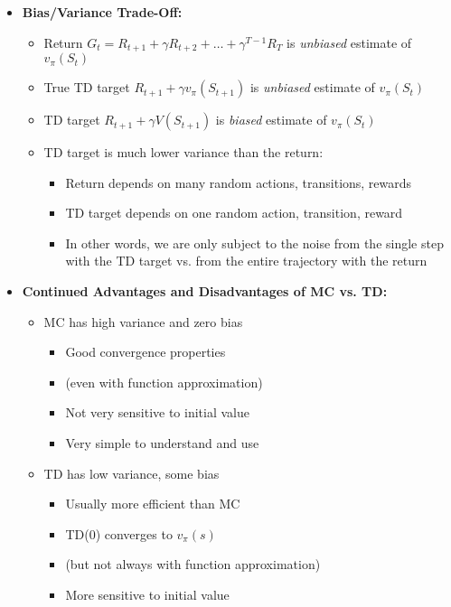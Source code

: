\documentclass[12pt]{article}
\begin{document}
\begin{itemize}
    \item \textbf{Bias/Variance Trade-Off:}
    \begin{itemize}
      \item Return $G_t = R_{t+1} + \gamma R_{t+2} + \dots + \gamma^{T-1}R_T$ is
      \textit{unbiased} estimate of $v_\pi(S_t)$
      \item True TD target $R_{t+1} + \gamma v_\pi(S_{t+1})$ is \textit{unbiased} 
      estimate of $v_\pi(S_t)$
      \item TD target $R_{t+1} + \gamma V(S_{t+1})$ is \textit{biased} estimate
      of $v_\pi(S_t)$
      \item TD target is much lower variance than the return:
      \begin{itemize}
        \item Return depends on many random actions, transitions, rewards
        \item TD target depends on one random action, transition, reward
        \item In other words, we are only subject to the noise from the single step with the TD target
        vs. from the entire trajectory with the return
      \end{itemize}
    \end{itemize}
    \item \textbf{Continued Advantages and Disadvantages of MC vs. TD:}
    \begin{itemize}
      \item MC has high variance and zero bias
      \begin{itemize}
        \item Good convergence properties
        \item (even with function approximation)
        \item Not very sensitive to initial value
        \item Very simple to understand and use
      \end{itemize}
      \item TD has low variance, some bias
      \begin{itemize}
        \item Usually more efficient than MC
        \item TD(0) converges to $v_\pi(s)$
        \item (but not always with function approximation)
        \item More sensitive to initial value
      \end{itemize}

\end{itemize}
\end{itemize}
\end{document}

